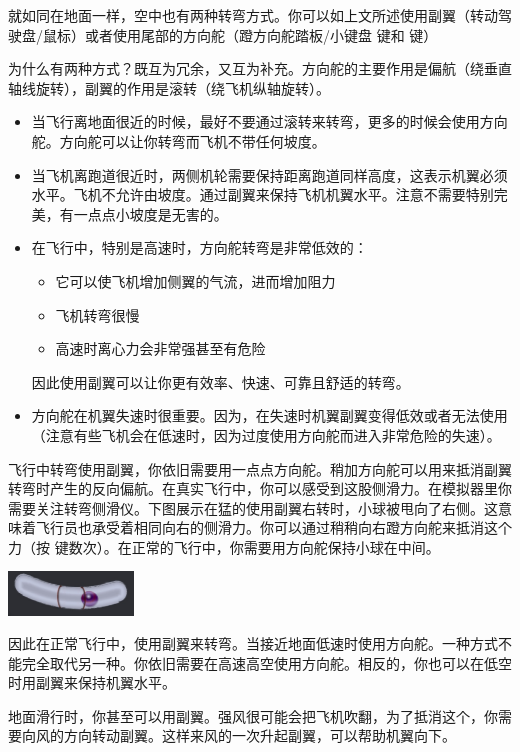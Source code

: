 就如同在地面一样，空中也有两种转弯方式。你可以如上文所述使用副翼（转动驾驶盘/鼠标）或者使用尾部的方向舵（蹬方向舵踏板/小键盘  键和  键）

为什么有两种方式？既互为冗余，又互为补充。方向舵的主要作用是偏航（绕垂直轴线旋转），副翼的作用是滚转（绕飞机纵轴旋转）。

\begin{itemize}
    \item 当飞行离地面很近的时候，最好不要通过滚转来转弯，更多的时候会使用方向舵。方向舵可以让你转弯而飞机不带任何坡度。
    \item 当飞机离跑道很近时，两侧机轮需要保持距离跑道同样高度，这表示机翼必须水平。飞机不允许由坡度。通过副翼来保持飞机机翼水平。注意不需要特别完美，有一点点小坡度是无害的。
    \item 在飞行中，特别是高速时，方向舵转弯是非常低效的：
    \begin{itemize}
    \item 它可以使飞机增加侧翼的气流，进而增加阻力
    \item 飞机转弯很慢
    \item 高速时离心力会非常强甚至有危险
    \end{itemize}
    因此使用副翼可以让你更有效率、快速、可靠且舒适的转弯。
    \item 方向舵在机翼失速时很重要。因为，在失速时机翼副翼变得低效或者无法使用（注意有些飞机会在低速时，因为过度使用方向舵而进入非常危险的失速）。
 \end{itemize}   

飞行中转弯使用副翼，你依旧需要用一点点方向舵。稍加方向舵可以用来抵消副翼转弯时产生的反向偏航。在真实飞行中，你可以感受到这股侧滑力。在模拟器里你需要关注转弯侧滑仪。下图展示在猛的使用副翼右转时，小球被甩向了右侧。这意味着飞行员也承受着相同向右的侧滑力。你可以通过稍稍向右蹬方向舵来抵消这个力（按  键数次）。在正常的飞行中，你需要用方向舵保持小球在中间。

\begin{center}
\includegraphics[width=0.25\textwidth]{img/tut_27}
\end{center}

因此在正常飞行中，使用副翼来转弯。当接近地面低速时使用方向舵。一种方式不能完全取代另一种。你依旧需要在高速高空使用方向舵。相反的，你也可以在低空时用副翼来保持机翼水平。

地面滑行时，你甚至可以用副翼。强风很可能会把飞机吹翻，为了抵消这个，你需要向风的方向转动副翼。这样来风的一次升起副翼，可以帮助机翼向下。

